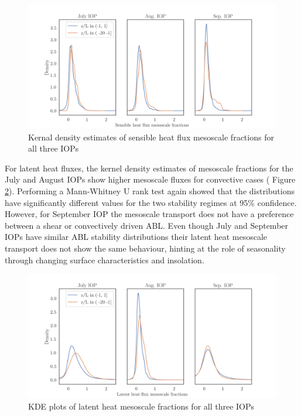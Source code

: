 \documentclass[draft]{agujournal2019}
\begin{document}
\begin{figure}[hbtp]
 \noindent\includegraphics[width=\textwidth]{figures_main/KDE_H_IOP.png}
\caption{ Kernal density estimates of sensible heat flux mesoscale fractions for all three IOPs}
\label{fig:KDE_H_IOP}
\end{figure}

For latent heat fluxes, the kernel density estimates of mesoscale fractions for the July and August IOPs show higher mesoscale fluxes for convective cases ( Figure \ref{fig:KDE_LE_IOP}). Performing a Mann-Whitney U rank test again showed that the distributions have significantly different values for the two stability regimes at 95\% confidence. However, for September IOP the mesoscale transport does not have a preference between a shear or convectively driven ABL. Even though July and September IOPs have similar ABL stability distributions their latent heat mesoscale transport does not show the same behaviour, hinting at the role of seasonality through changing surface characteristics and insolation. 
\begin{figure}[hbtp]
 \noindent\includegraphics[width=\textwidth]{figures_main/KDE_LE_IOP.png}
\caption{ KDE plots of latent heat mesoscale fractions for all three IOPs}
\label{fig:KDE_LE_IOP}
\end{figure}
\end{document}

